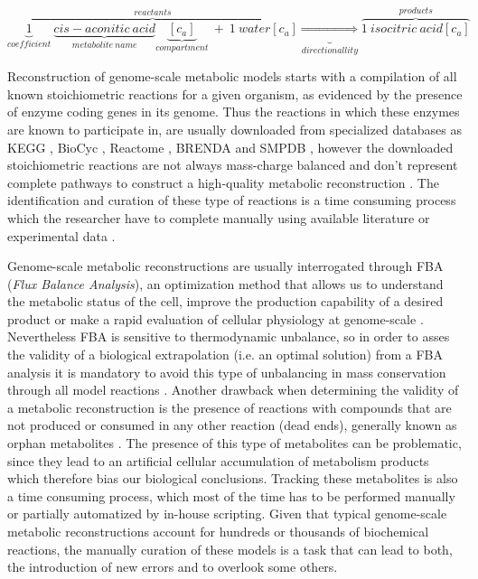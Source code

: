 \begin{equation}
\label{sr}
\overbrace{\underbrace{1}_{coefficient}\ \underbrace{cis-aconitic\ acid}_{metabolite\ name}\underbrace{[c_a]}_{compartment}\ +\ 1\ water[c_a]}^{reactants} \underbrace{\Rightarrow}_{directionallity} \overbrace{1\ isocitric\ acid[c_a]}^{products}
\end{equation}

Reconstruction of genome-scale metabolic models starts with a compilation of all known stoichiometric reactions for a given organism, as evidenced by the presence of enzyme coding genes in its genome. Thus the reactions in which these enzymes are known to  participate in, are usually downloaded from specialized databases as KEGG \cite{Kanehisa2000}, BioCyc \cite{Caspi2014}, Reactome \cite{Croft2014}, BRENDA \cite{Chang2015} and SMPDB \cite{Jewison2014}, however the downloaded stoichiometric reactions are not always mass-charge balanced and don't represent complete pathways to construct a high-quality metabolic reconstruction \cite{Thiele2010, Gevorgyan2008}. The identification and curation of these type of reactions is a time consuming process which  the researcher have to complete manually using available literature or experimental data \cite{Lakshmanan2014}.

Genome-scale metabolic reconstructions are usually interrogated through FBA (\emph{Flux Balance Analysis}), an optimization method that allows us to understand the metabolic status of the cell, improve the production capability of a desired product or make a rapid evaluation of cellular physiology at genome-scale \cite{Kim2008,Park2009}. Nevertheless FBA is sensitive to thermodynamic unbalance, so in order to asses the validity of a biological extrapolation (i.e. an optimal solution) from a FBA analysis it is mandatory to avoid this type of unbalancing in mass conservation through all model reactions \cite{Reznik2013}. Another drawback when determining  the validity of a metabolic reconstruction is the presence of  reactions with compounds that are not produced or consumed in any other reaction (dead ends), generally known as orphan metabolites  \cite{Park2009, Thiele2010}. The presence of this type of metabolites can be problematic, since they lead to an artificial cellular  accumulation of  metabolism products which therefore  bias our biological conclusions. Tracking these metabolites is also a time consuming process, which most of the time has to be performed manually or partially automatized by in-house scripting. Given that typical genome-scale metabolic reconstructions account for hundreds or thousands of biochemical reactions, the manually curation of these models is a task that can lead to both, the introduction of new errors and to overlook some others.

